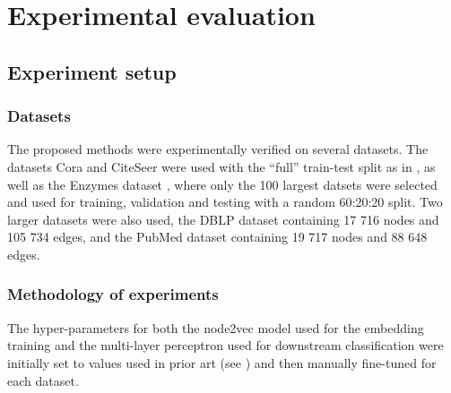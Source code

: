 \section{Experimental evaluation}\label{sec:experimental-evaluation}

\subsection{Experiment setup}

\subsubsection{Datasets}

The proposed methods were experimentally verified on several datasets. The datasets Cora and CiteSeer \cite{yang_revisiting_2016} were used with the \enquote{full} train-test split as in \cite{chen_fastgcn_2018}, as well as the Enzymes dataset \cite{morris_tudataset_2020}, where only the 100 largest datsets were selected and used for training, validation and testing with a random 60:20:20 split. Two larger datasets were also used, the DBLP dataset \cite{bojchevski_deep_2018} containing 17 716 nodes and 105 734 edges, and the PubMed dataset \cite{yang_revisiting_2016} containing 19 717 nodes and 88 648 edges.

\subsubsection{Methodology of experiments}

The hyper-parameters for both the node2vec model used for the embedding training and the multi-layer perceptron used for downstream classification were initially set to values used in prior art (see \cite{hu_open_2021, fey_fast_2019}) and then manually fine-tuned for each dataset.

